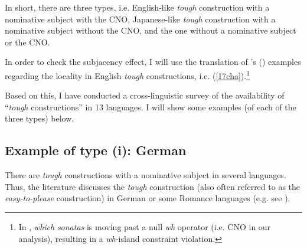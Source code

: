 \documentclass[output=paper]{langscibook}
\begin{document}
In short, there are three types, i.e. English-like \textit{tough} construction with a nominative subject with the CNO, Japanese-like \textit{tough} construction with a nominative subject without the CNO, and the one without a nominative subject or the CNO. 

In order to check the subjacency effect, I will use the translation of \citeauthor{Chomsky1977}’s (\citeyear{Chomsky1977}) examples regarding the locality in English \textit{tough} constructions, i.e. (\ref{17cha}).\footnote{In , \textit{which} \textit{sonatas} is moving past a null \textit{wh} operator (i.e. CNO in our analysis), resulting in a \textit{wh}-island constraint violation.}

\begin{exe}
\ex \label{17ha}
\begin{xlist}
\ex \label{17bha}
\begin{xlist}

\end{xlist}
\ex \label{17cha}
\begin{xlist}

\end{xlist}

\ex 
\begin{xlist}

\end{xlist}
\end{xlist}
\end{exe}

Based on this, I have conducted a cross-linguistic survey of the availability of “\textit{tough} constructions” in 13 languages. I will show some examples (of each of the three types) below.

\subsection{Example of type (i): German} \label{s3.2ha}
There are \textit{tough} constructions with a nominative subject in several languages. Thus, the literature discusses the \textit{tough} construction (also often referred to as the \textit{easy-to-please} construction) in German or some Romance languages (e.g. see \citealt{MontalbettiMarioTravis1982, Cinque1990, Roberts1993, Wurmbrand2001}).
\end{document}
